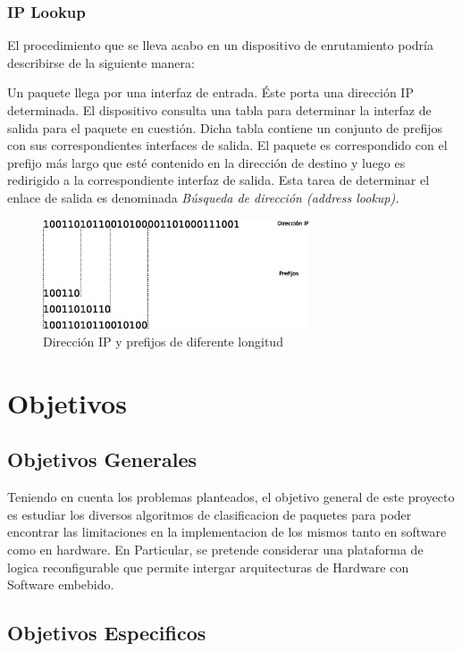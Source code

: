 \subsubsection{IP Lookup}

El procedimiento que se lleva acabo en un dispositivo de enrutamiento podría describirse de la siguiente manera:

Un paquete llega por una interfaz de entrada. Éste porta una dirección IP determinada. El dispositivo consulta una tabla para determinar la interfaz de salida para el paquete en cuestión. Dicha tabla contiene un conjunto de prefijos con sus correspondientes interfaces de salida. El paquete es correspondido con el prefijo más largo que esté contenido en la dirección de destino y luego es redirigido  a la correspondiente interfaz de salida. Esta tarea de determinar el enlace de salida es denominada \textit{Búsqueda de dirección (address lookup).}

 \begin{figure}[h]
  \centering
	 \includegraphics[width=0.7\textwidth]{1-introduccion/graf/prefijos.eps}
  \caption{Dirección IP y prefijos de diferente longitud}
  \label{fig:prefijos}
\end{figure}



\section{Objetivos}
\subsection{Objetivos Generales}
Teniendo en cuenta los problemas planteados, el objetivo general de este proyecto es estudiar los diversos algoritmos de clasificacion de paquetes para poder encontrar las limitaciones en la implementacion de los mismos tanto en software como en hardware. 
En Particular, se pretende considerar una plataforma de logica reconfigurable que permite intergar arquitecturas de Hardware con Software embebido.

\subsection{Objetivos Especificos}

